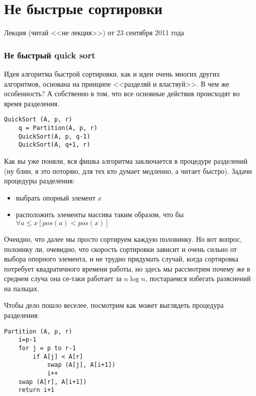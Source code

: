 \chapter{Не быстрые сортировки}

Лекция (читай <<не лекция>>) от 23 сентября 2011 года

\subsection{Не быстрый quick sort}

Идея алгоритма быстрой сортировки, как и идеи очень многих других алгоритмов, основана на принципе <<разделяй и властвуй>>. В чем же особенность? А собственно в том, что все основные действия происходят во время разделения.

\begin{lstlisting}
QuickSort (A, p, r)
	q = Partition(A, p, r)
	QuickSort(A, p, q-1)
	QuickSort(A, q+1, r)
\end{lstlisting}

Как вы уже поняли, вся фишка алгоритма заключается в процедуре разделений (ну блин, я это поторяю, для тех кто думает медленно, а читает быстро). Задачи процедуры разделения:
\begin{itemize}
\item выбрать опорный элемент $x$

\item расположить элементы массива таким образом, что бы $\forall a \le x \left[ pos \left(a\right) < pos \left(x\right) \right]$
\end{itemize}

Очеидно, что далее мы просто сортируем каждую половинку. Но вот вопрос, полоинку ли, очевидно, что скорость сортировки зависит и очень сильно от выбора опорного элемента, и не трудно придумать случай, когда сортировка потребует квадратичного времени работы, но здесь мы рассмотрим почему же в среднем случа она се-таки работает за $n \log n$, постараемся избегать разяснений на пальцах.

Чтобы дело пошло веселее, посмотрим как может выглядеть процедура разделения:

\begin{lstlisting}
Partition (A, p, r)
	i=p-1
	for j = p to r-1
		if A[j] < A[r]
			swap (A[j], A[i+1])
			i++
	swap (A[r], A[i+1])
	return i+1
\end{lstlisting}

